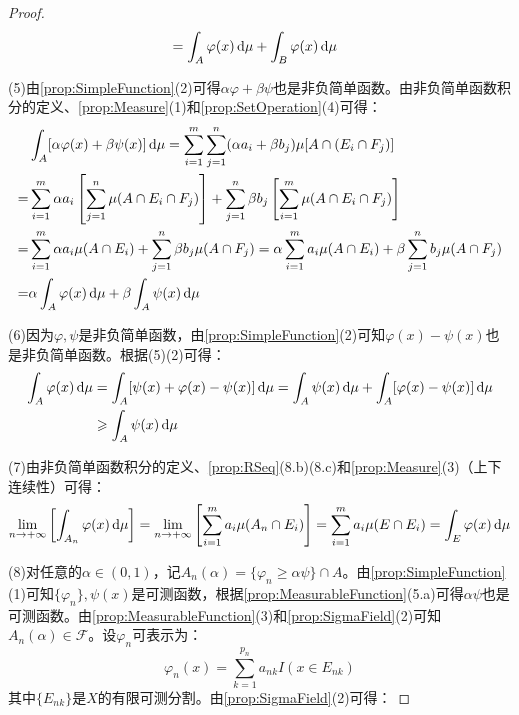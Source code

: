 \begin{proof}
\begin{align*}
		&=\int_{A}\varphi(x)\mathop{}\!\mathrm{d}\mu+\int_{B}\varphi(x)\mathop{}\!\mathrm{d}\mu
	\end{align*}\par
	(5)由\cref{prop:SimpleFunction}(2)可得$\alpha\varphi+\beta\psi$也是非负简单函数。由非负简单函数积分的定义、\cref{prop:Measure}(1)和\cref{prop:SetOperation}(4)可得：
	\begin{align*}
		&\int_{A}[\alpha\varphi(x)+\beta\psi(x)]\mathop{}\!\mathrm{d}\mu
		=\sum_{i=1}^{m}\sum_{j=1}^{n}(\alpha a_i+\beta b_j)\mu[A\cap (E_i\cap F_j)] \\
		=&\sum_{i=1}^{m}\alpha a_i\left[\sum_{j=1}^{n}\mu(A\cap E_i\cap F_j)\right]+\sum_{j=1}^{n}\beta b_j\left[\sum_{i=1}^{m}\mu(A\cap E_i\cap F_j)\right] \\ =&\sum_{i=1}^{m}\alpha a_i\mu(A\cap E_i)+\sum_{j=1}^{n}\beta b_j\mu(A\cap F_j) =\alpha\sum_{i=1}^{m}a_i\mu(A\cap E_i)+\beta\sum_{j=1}^{n}b_j\mu(A\cap F_j) \\
		=&\alpha\int_{A}\varphi(x)\mathop{}\!\mathrm{d}\mu+\beta\int_{A}\psi(x)\mathop{}\!\mathrm{d}\mu
	\end{align*}\par
	(6)因为$\varphi,\psi$是非负简单函数，由\cref{prop:SimpleFunction}(2)可知$\varphi(x)-\psi(x)$也是非负简单函数。根据(5)(2)可得：
	\begin{align*}
		\int_{A}\varphi(x)\mathop{}\!\mathrm{d}\mu&=\int_{A}[\psi(x)+\varphi(x)-\psi(x)]\mathop{}\!\mathrm{d}\mu=\int_{A}\psi(x)\mathop{}\!\mathrm{d}\mu+\int_{A}[\varphi(x)-\psi(x)]\mathop{}\!\mathrm{d}\mu \\
		&\geqslant\int_{A}\psi(x)\mathop{}\!\mathrm{d}\mu
	\end{align*}\par
	(7)由非负简单函数积分的定义、\cref{prop:RSeq}(8.b)(8.c)和\cref{prop:Measure}(3)（上下连续性）可得：
	\begin{equation*}
		\lim_{n\to+\infty}\left[\int_{A_n}\varphi(x)\mathop{}\!\mathrm{d}\mu\right]
		=\lim_{n\to+\infty}\left[\sum_{i=1}^{m}a_i\mu(A_n\cap E_i)\right]
		=\sum_{i=1}^{m}a_i\mu(E\cap E_i)
		=\int_{E}\varphi(x)\mathop{}\!\mathrm{d}\mu
	\end{equation*}\par
	(8)对任意的$\alpha\in(0,1)$，记$A_n(\alpha)=\{\varphi_n\geqslant\alpha\psi\}\cap A$。由\cref{prop:SimpleFunction}(1)可知$\{\varphi_n\},\psi(x)$是可测函数，根据\cref{prop:MeasurableFunction}(5.a)可得$\alpha\psi$也是可测函数。由\cref{prop:MeasurableFunction}(3)和\cref{prop:SigmaField}(2)可知$A_n(\alpha)\in\mathscr{F}$。设$\varphi_n$可表示为：
	\begin{equation*}
		\varphi_n(x)=\sum_{k=1}^{p_n}a_{nk}I(x\in E_{nk})
	\end{equation*}
	其中$\{E_{nk}\}$是$X$的有限可测分割。由\cref{prop:SigmaField}(2)可得：

\end{proof}
